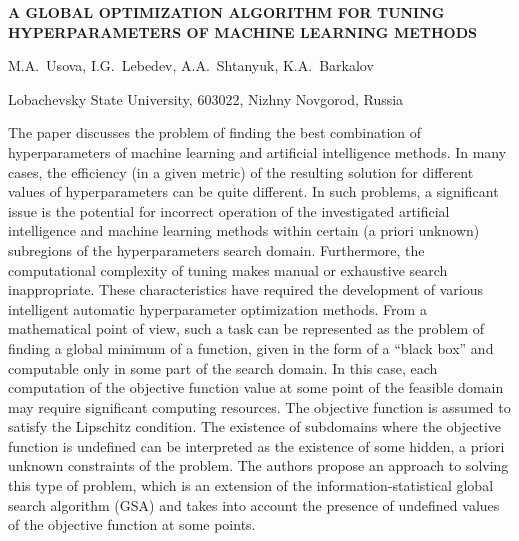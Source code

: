 \documentclass[a4paper,12pt,russian]{article}
\begin{document}
\begin{center}
	\textbf{A GLOBAL OPTIMIZATION ALGORITHM FOR \break
    TUNING HYPERPARAMETERS OF MACHINE LEARNING METHODS} 
\end{center}

\begin{center}
{M.A.~Usova, I.G.~Lebedev, A.A.~Shtanyuk, K.A.~Barkalov}
\end{center}

\begin{center}
{Lobachevsky State University, 603022, Nizhny Novgorod, Russia}
\end{center}
\begin{small}

The paper discusses  the problem of finding the best combination of hyperparameters of machine learning and artificial intelligence methods. In many cases, the efficiency (in a given metric) of the resulting solution for different values of hyperparameters can be quite different.
In such problems, a significant issue is the potential for incorrect operation of the investigated artificial intelligence and machine learning methods within certain (a priori unknown) subregions of the hyperparameters search domain. Furthermore, the computational complexity of tuning makes manual or exhaustive search inappropriate. These characteristics have required the development of various intelligent automatic hyperparameter optimization methods.
From a mathematical point of view, such a task can be re\-pre\-sen\-ted as the problem of finding a global minimum of a function, given in the form of a ``black box'' and computable only in some part of the search domain. In this case, each computation of the objective function value at some point of the feasible domain may require significant computing resources. The objective function is assumed to satisfy the Lipschitz condition. The existence of subdomains where the objective function is undefined can be interpreted as the existence of some hidden, a priori unknown constraints of the problem. 
The authors propose an approach to solving this type of problem, which is an extension of the information-statistical global search algorithm (GSA) and takes into account the presence of undefined values of the objective function at some points. 

\end{small}
\end{document}
